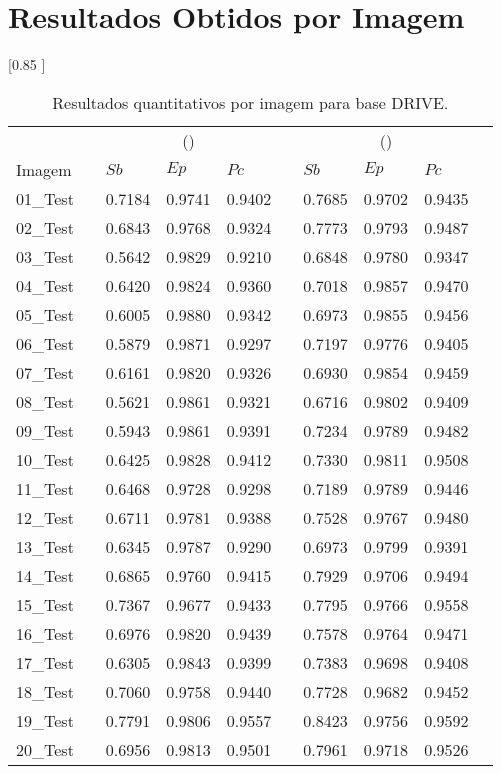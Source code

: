 \chapter{Resultados Obtidos por Imagem} \label{ap:amostras}
\thispagestyle{empty}

\begin{table}[h!] 
\caption{Resultados quantitativos por imagem para base DRIVE.} 
\label{tabAllDRIVE} 
\centering 
\scalebox {0.85 }[0.85 ]{  
\begin{tabular}{llllllllll}  
\toprule  
&  & \multicolumn{3}{c}{\citeauthor{Zana:2001} (\citeyear{Zana:2001})} &  & \multicolumn{3}{c}{\citeauthor{Soares:2006} (\citeyear{Soares:2006})} \\  
\cmidrule{3-5} \cmidrule{7-9}  
Imagem &  & $Sb$ & $Ep$ & $Pc$ & & $Sb$ & $Ep$ & $Pc$ \\  
\midrule  
01\_Test &  & 0.7184 & 0.9741 & 0.9402 & & 0.7685 & 0.9702 & 0.9435  \\  
02\_Test &  & 0.6843 & 0.9768 & 0.9324 & & 0.7773 & 0.9793 & 0.9487  \\  
03\_Test &  & 0.5642 & 0.9829 & 0.9210 & & 0.6848 & 0.9780 & 0.9347  \\  
04\_Test &  & 0.6420 & 0.9824 & 0.9360 & & 0.7018 & 0.9857 & 0.9470  \\  
05\_Test &  & 0.6005 & 0.9880 & 0.9342 & & 0.6973 & 0.9855 & 0.9456  \\  
06\_Test &  & 0.5879 & 0.9871 & 0.9297 & & 0.7197 & 0.9776 & 0.9405  \\  
07\_Test &  & 0.6161 & 0.9820 & 0.9326 & & 0.6930 & 0.9854 & 0.9459  \\  
08\_Test &  & 0.5621 & 0.9861 & 0.9321 & & 0.6716 & 0.9802 & 0.9409  \\  
09\_Test &  & 0.5943 & 0.9861 & 0.9391 & & 0.7234 & 0.9789 & 0.9482  \\  
10\_Test &  & 0.6425 & 0.9828 & 0.9412 & & 0.7330 & 0.9811 & 0.9508  \\  
11\_Test &  & 0.6468 & 0.9728 & 0.9298 & & 0.7189 & 0.9789 & 0.9446  \\  
12\_Test &  & 0.6711 & 0.9781 & 0.9388 & & 0.7528 & 0.9767 & 0.9480  \\  
13\_Test &  & 0.6345 & 0.9787 & 0.9290 & & 0.6973 & 0.9799 & 0.9391  \\  
14\_Test &  & 0.6865 & 0.9760 & 0.9415 & & 0.7929 & 0.9706 & 0.9494  \\  
15\_Test &  & 0.7367 & 0.9677 & 0.9433 & & 0.7795 & 0.9766 & 0.9558  \\  
16\_Test &  & 0.6976 & 0.9820 & 0.9439 & & 0.7578 & 0.9764 & 0.9471  \\  
17\_Test &  & 0.6305 & 0.9843 & 0.9399 & & 0.7383 & 0.9698 & 0.9408  \\  
18\_Test &  & 0.7060 & 0.9758 & 0.9440 & & 0.7728 & 0.9682 & 0.9452  \\  
19\_Test &  & 0.7791 & 0.9806 & 0.9557 & & 0.8423 & 0.9756 & 0.9592  \\  
20\_Test &  & 0.6956 & 0.9813 & 0.9501 & & 0.7961 & 0.9718 & 0.9526  \\  
\bottomrule  
\end{tabular}  
}  
\end{table}  

